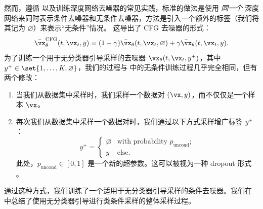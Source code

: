 \documentclass[../../book-main_zh.tex]{subfiles}
\begin{document}
然而，遵循 \textcite{Ho2022-ry} 以及训练深度网络去噪器的常见实践，标准的做法是使用 \textit{同一个} 深度网络来同时表示条件去噪器和无条件去噪器，方法是引入一个额外的标签（我们将其记为 $\varnothing$）来表示“无条件”情况。
这导出了 CFG 去噪器的形式：
\begin{equation}\label{eq:conditional-denoising-mmse-denoiser-paired-data-approx-cfg}
    \bar{\vx}_{\theta}^{\mathrm{CFG}}(t, \vx_t, y)
    =
    (1 - \gamma) \bar{\vx}_{\theta}(t, \vx_t, \varnothing)
    +
    \gamma \bar{\vx}_{\theta}(t, \vx_t, y).
\end{equation}
为了训练一个用于无分类器引导采样的去噪器 $\bar{\vx}_{\theta}(t, \vx_t, y^+)$，其中 $y^+ \in \set{1, \dots, K, \varnothing}$，我们的过程与  中的无条件训练过程几乎完全相同，但有两个修改：
\begin{enumerate}
    \item 当我们从数据集中采样时，我们采样一个数据对 $(\vx, y)$，而不仅仅是一个样本 $\vx$。
    \item 每次我们从数据集中采样一个数据对时，我们通过以下方式采样增广标签 $y^+$：
        \begin{equation}
            y^+ =
            \begin{cases}
                \varnothing & \text{with probability } p_{\mathrm{uncond}}; \\
                y & \text{else}.
            \end{cases}
        \end{equation}
        此处，$p_{\mathrm{uncond}} \in [0, 1]$ 是一个新的超参数。这可以被视为一种 dropout 形式 \cite{srivastava2014dropout}。
\end{enumerate}
通过这种方式，我们训练了一个适用于无分类器引导采样的条件去噪器。我们在  中总结了使用无分类器引导进行类条件采样的整体采样过程。
\end{document}
